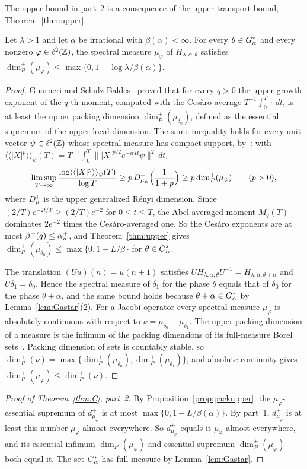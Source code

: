 The upper bound in part~2 is a consequence of the upper transport bound, Theorem~\ref{thm:upper}.

\begin{proposition}\label{prop:packupper}
Let $\lambda>1$ and let $\alpha$ be irrational with $\beta(\alpha)<\infty$. For every $\theta\in G_\alpha^*$ and every nonzero $\varphi\in\ell^2(\mathbb Z)$, the spectral measure $\mu_\varphi$ of $H_{\lambda,\alpha,\theta}$ satisfies $\dim_P^+(\mu_\varphi)\le\max\{0,1-\log\lambda/\beta(\alpha)\}$.
\end{proposition}

\begin{proof}
Guarneri and Schulz-Baldes~\cite[Theorem~1]{GSB1999} proved that for every $q>0$ the upper growth exponent of the $q$-th moment, computed with the Ces\`aro average $T^{-1}\int_0^T\cdot\,dt$, is at least the upper packing dimension $\dim_P^+(\mu_{\delta_0})$, defined as the essential supremum of the upper local dimension. The same inequality holds for every unit vector $\psi\in\ell^2(\mathbb Z)$ whose spectral measure has compact support, by~\cite[Theorem~1 and Proposition~1(iii)]{BGT2000}: with $\langle\langle|X|^p\rangle\rangle_\psi(T)=T^{-1}\int_0^T\||X|^{p/2}e^{-itH}\psi\|^2\,dt$,
\[
\limsup_{T\to\infty}\frac{\log\langle\langle|X|^p\rangle\rangle_\psi(T)}{\log T}\ge p\,D^+_{\mu_\psi}\Bigl(\frac1{1+p}\Bigr)\ge p\dim_P^+(\mu_\psi)\qquad(p>0),
\]
where $D^+_\mu$ is the upper generalized R\'enyi dimension. Since $(2/T)e^{-2t/T}\ge(2/T)e^{-2}$ for $0\le t\le T$, the Abel-averaged moment $M_q(T)$ dominates $2e^{-2}$ times the Ces\`aro-averaged one. So the Ces\`aro exponents are at most $\beta^+(q)\le\alpha_u^+$, and Theorem~\ref{thm:upper} gives $\dim_P^+(\mu_{\delta_0})\le\max\{0,1-L/\beta\}$ for $\theta\in G_\alpha^*$.

The translation $(Uu)(n)=u(n+1)$ satisfies $UH_{\lambda,\alpha,\theta}U^{-1}=H_{\lambda,\alpha,\theta+\alpha}$ and $U\delta_1=\delta_0$. Hence the spectral measure of $\delta_1$ for the phase $\theta$ equals that of $\delta_0$ for the phase $\theta+\alpha$, and the same bound holds because $\theta+\alpha\in G_\alpha^*$ by Lemma~\ref{lem:Gastar}(2). For a Jacobi operator every spectral measure $\mu_\varphi$ is absolutely continuous with respect to $\nu=\mu_{\delta_0}+\mu_{\delta_1}$. The upper packing dimension of a measure is the infimum of the packing dimensions of its full-measure Borel sets~\cite[Appendix]{GSB1999}. Packing dimension of sets is countably stable, so $\dim_P^+(\nu)=\max\{\dim_P^+(\mu_{\delta_0}),\dim_P^+(\mu_{\delta_1})\}$, and absolute continuity gives $\dim_P^+(\mu_\varphi)\le\dim_P^+(\nu)$.
\end{proof}

\begin{proof}[Proof of Theorem~\ref{thm:C}, part~2]
By Proposition~\ref{prop:packupper}, the $\mu_\varphi$-essential supremum of $d^+_{\mu_\varphi}$ is at most $\max\{0,1-L/\beta(\alpha)\}$. By part~1, $d^+_{\mu_\varphi}$ is at least this number $\mu_\varphi$-almost everywhere. So $d^+_{\mu_\varphi}$ equals it $\mu_\varphi$-almost everywhere, and its essential infimum $\dim_P^-(\mu_\varphi)$ and essential supremum $\dim_P^+(\mu_\varphi)$ both equal it. The set $G_\alpha^*$ has full measure by Lemma~\ref{lem:Gastar}.
\end{proof}
